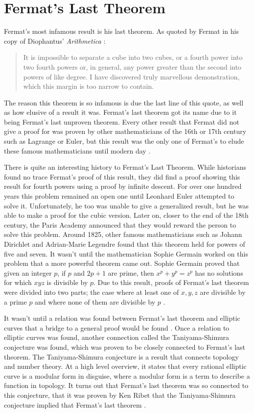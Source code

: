 \documentclass[11pt]{article}
\begin{document}
\section*{Fermat's Last Theorem}
Fermat's most infamous result is his last theorem.
As quoted by Fermat in his copy of
Diophantus' \emph{Arithmetica} \cite{Kleiner}:
\begin{quote}
    It is impossible to separate a cube into two cubes, or a fourth power into
    two fourth powers or, in general, any power greater than the second into
    powers of like degree. I have discovered truly marvellous demonstration,
    which this margin is too narrow to contain.
\end{quote}
The reason this theorem is so infamous is due the last line of this quote, as
well as how elusive of a result it was.
Fermat's last theorem got its name due to it being Fermat's last unproven
theorem.
Every other result that Fermat did not give a proof for was proven by other 
mathematicians of the 16th or 17th century such as Lagrange or Euler, but this
result was the only one of Fermat's to elude these famous
mathematicians until modern day \cite{Kleiner}.

There is quite an interesting history to Fermat's Last Theorem.
While historians found no trace Fermat's proof of this result, they did find
a proof showing this result for fourth powers using a proof by infinite descent.
For over one hundred years this problem remained an open one until Leonhard
Euler attempted to solve it.
Unfortunately, he too was unable to give a generalized result, but he was able
to make a proof for the cubic version.
Later on, closer to the end of the 18th century, the Paris Academy announced that
they would reward the person to solve this problem.
Around 1825, other famous mathematicians such as Johann Dirichlet and 
Adrian-Marie Legendre found that this theorem held for powers of five and seven.
It wasn't until the mathematician Sophie Germain worked on this problem that
a more powerful theorem came out.
Sophie Germain proved that given an integer $p$, if $p$ and $2p+1$ are prime,
then $x^p + y^p = z^p$ has no solutions for which $xyz$ is divisible by $p$.
Due to this result, proofs of Fermat's last theorem were divided into two parts;
the case where at least one of $x,y,z$ are divisible by a prime $p$ and where
none of them are divisible by $p$ \cite{Kleiner}.

It wasn't until a relation was found between Fermat's last theorem and elliptic
curves that a bridge to a general proof would be found \cite{Kleiner}.
Once a relation to elliptic curves was found, another connection called the
Taniyama-Shimura conjecture was found, which was proven to be closely connected to
Fermat's last theorem.
The Taniyama-Shimura conjecture is a result that connects topology and number
theory.
At a high level overview, it states that every rational elliptic curve is a
modular form in disguise, where a modular form is a term to describe a function
in topology.
It turns out that Fermat's last theorem was so connected to this conjecture,
that it was proven by Ken Ribet that the Taniyama-Shimura conjecture implied
that Fermat's last theorem \cite{Kleiner}.
\end{document}

